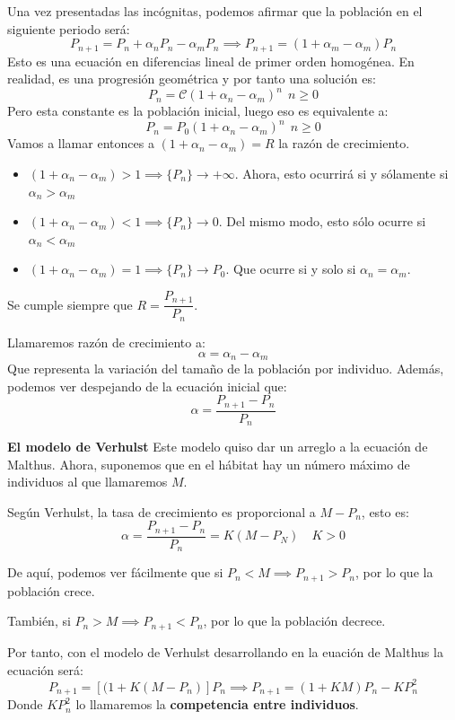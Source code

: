 Una vez presentadas las incógnitas, podemos afirmar que la población en el siguiente periodo será:
\[
P_{n+1} = P_n + \alpha_n P_n - \alpha_m P_n \implies P_{n+1}=(1+\alpha_m-\alpha_m)P_n
\]
Esto es una ecuación en diferencias lineal de primer orden homogénea. En realidad, es una progresión geométrica y por tanto una solución es:
\[
P_n =\mathcal{C} (1+\alpha_n-\alpha_m)^n \ \ n \geq 0
\]
Pero esta constante es la población inicial, luego eso es equivalente a:
\[
P_n =P_0 (1+\alpha_n-\alpha_m)^n \ \ n \geq 0
\]
Vamos a llamar entonces a $(1+\alpha_n-\alpha_m) = R$ la razón de crecimiento.
\begin{itemize}
	\item $(1+\alpha_n-\alpha_m) > 1 \implies \{P_n\}\to +\infty$. Ahora, esto ocurrirá si y sólamente si $\alpha_n > \alpha_m$

	\item $(1+\alpha_n-\alpha_m) < 1 \implies \{P_n\}\to 0$. Del mismo modo, esto sólo ocurre si $\alpha_n < \alpha_m$

	\item $(1+\alpha_n-\alpha_m) = 1 \implies \{P_n\} \to P_0$. Que ocurre si y solo si $\alpha_n = \alpha_m$.
\end{itemize}

Se cumple siempre que $R = \dfrac{P_{n+1}}{P_n}$.

\begin{ndef}
	Llamaremos razón de crecimiento a:
	\[
	\alpha = \alpha_n - \alpha_m
	\]
	Que representa la variación del tamaño de la población por individuo. Además, podemos ver despejando de la ecuación inicial que:
	\[
	\alpha = \dfrac{P_{n+1}-P_n}{P_n}
	\]

\end{ndef}

\textbf{El modelo de Verhulst}
Este modelo quiso dar un arreglo a la ecuación de Malthus. Ahora, suponemos que en el hábitat hay un número máximo de individuos al que llamaremos $M$.

Según Verhulst, la tasa de crecimiento es proporcional a $M-P_n$, esto es:
\[
\alpha = \dfrac{P_{n+1}-P_n}{P_n} = K (M-P_N) \quad K > 0
\]

De aquí, podemos ver fácilmente que si $P_n < M \implies P_{n+1} > P_n$, por lo que la población crece.

También, si $P_n > M \implies P_{n+1} < P_n$, por lo que la población decrece.

Por tanto, con el modelo de Verhulst desarrollando en la euación de Malthus la ecuación será:
\[
P_{n+1} = [(1+K(M-P_n)]P_n \implies P_{n+1} = (1+KM)P_n -KP_n^2
\]
Donde $KP_n^2$ lo llamaremos la \textbf{competencia entre individuos}.

